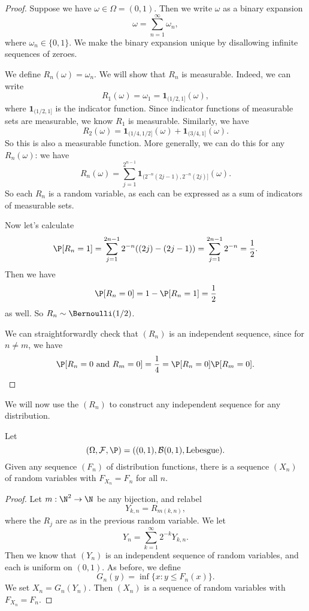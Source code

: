\documentclass[a4paper]{article}
\begin{document}
\begin{proof}
  Suppose we have $\omega \in \Omega = (0, 1)$. Then we write $\omega$ as a binary expansion
  \[
    \omega = \sum_{n = 1}^\infty \omega_n,
  \]
  where $\omega_n \in \{0, 1\}$. We make the binary expansion unique by disallowing infinite sequences of zeroes.

  We define $R_n(\omega) = \omega_n$. We will show that $R_n$ is measurable. Indeed, we can write
  \[
    R_1(\omega) = \omega_1 = \mathbf{1}_{(1/2, 1]}(\omega),
  \]
  where $\mathbf{1}_{(1/2, 1]}$ is the indicator function. Since indicator functions of measurable sets are measurable, we know $R_1$ is measurable. Similarly, we have
  \[
    R_2(\omega) = \mathbf{1}_{(1/4, 1/2]}(\omega) + \mathbf{1}_{(3/4, 1]}(\omega).
  \]
  So this is also a measurable function. More generally, we can do this for any $R_n(\omega)$: we have
  \[
    R_n(\omega) = \sum_{j = 1}^{2^{n - 1}} \mathbf{1}_{(2^{-n}(2j - 1), 2^{-n}(2j)]} (\omega).
  \]
  So each $R_n$ is a random variable, as each can be expressed as a sum of indicators of measurable sets.

  Now let's calculate
  \[
    \P[R_n = 1] = \sum_{j = 1}^{2n - 1} 2^{-n}((2j) - (2j - 1)) = \sum_{j = 1}^{2n - 1} 2^{-n} = \frac{1}{2}.
  \]
  Then we have
  \[
    \P[R_n = 0] = 1 - \P[R_n = 1] = \frac{1}{2}
  \]
  as well. So $R_n \sim \Bernoulli(1/2)$.

  We can straightforwardly check that $(R_n)$ is an independent sequence, since for $n \not= m$, we have
  \[
    \P[R_n = 0 \text{ and }R_m = 0] = \frac{1}{4} = \P[R_n = 0] \P[R_m = 0].
  \]
\end{proof}

We will now use the $(R_n)$ to construct any independent sequence for any distribution.

\begin{prop}
  Let
  \[
    (\Omega, \mathcal{F}, \P) = ((0, 1), \mathcal{B}(0, 1), \text{Lebesgue}).
  \]
  Given any sequence $(F_n)$ of distribution functions, there is a sequence $(X_n)$ of random variables with $F_{X_n} = F_n$ for all $n$.
\end{prop}

\begin{proof}
  Let $m: \N^2 \to \N$ be any bijection, and relabel
  \[
    Y_{k, n} = R_{m(k, n)},
  \]
  where the $R_j$ are as in the previous random variable. We let
  \[
    Y_n = \sum_{k = 1}^\infty 2^{-k} Y_{k, n}.
  \]
  Then we know that $(Y_n)$ is an independent sequence of random variables, and each is uniform on $(0, 1)$. As before, we define
  \[
    G_n(y) = \inf\{x: y \leq F_n(x)\}.
  \]
  We set $X_n = G_n(Y_n)$. Then $(X_n)$ is a sequence of random variables with $F_{X_n} = F_n$.
\end{proof}
\end{document}
